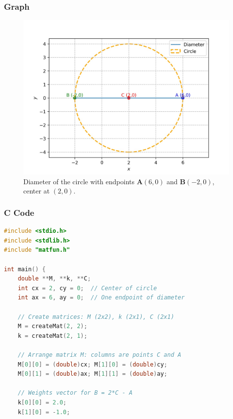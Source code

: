 \documentclass{beamer}
\theoremstyle{remark}
\numberwithin{equation}{section}
\numberwithin{equation}{section}
\begin{document}
\begin{frame}
    \frametitle{Graph}
    \begin{figure}[h!]
        \centering
        \includegraphics[width=0.7\linewidth]{FIG/graph.png}
        \caption{Diameter of the circle with endpoints $\mathbf{A}(6,0)$ and $\mathbf{B}(-2,0)$, center at $(2,0)$.}
    \end{figure}
\end{frame}
\begin{frame}[fragile]
\frametitle{C Code }
\begin{lstlisting}[language=C]
#include <stdio.h>
#include <stdlib.h>
#include "matfun.h"

int main() {
    double **M, **k, **C;
    int cx = 2, cy = 0;  // Center of circle
    int ax = 6, ay = 0;  // One endpoint of diameter

    // Create matrices: M (2x2), k (2x1), C (2x1)
    M = createMat(2, 2);
    k = createMat(2, 1);

    // Arrange matrix M: columns are points C and A
    M[0][0] = (double)cx; M[1][0] = (double)cy;
    M[0][1] = (double)ax; M[1][1] = (double)ay;

    // Weights vector for B = 2*C - A
    k[0][0] = 2.0;
    k[1][0] = -1.0;

\end{lstlisting}
\end{frame}
\end{document}
